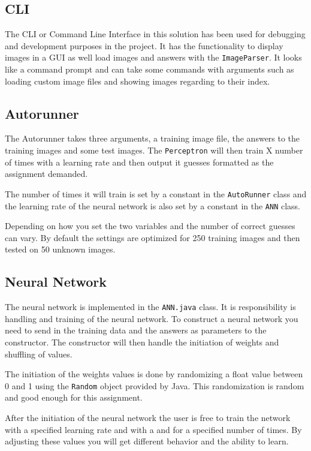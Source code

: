 \documentclass[a4paper, 12pt]{article}
\begin{document}
\subsection{CLI}
The CLI or Command Line Interface in this solution has been used for debugging and development purposes in the project. It has the functionality to display images in a GUI as well load images and answers with the \verb|ImageParser|. It looks like a command prompt and can take some commands with arguments such as loading custom image files and showing images regarding to their index.

\subsection{Autorunner}
The Autorunner takes three arguments, a training image file, the answers to the training images and some test images. The \verb|Perceptron| will then train X number of times with a learning rate and then output it guesses formatted as the assignment demanded.

The number of times it will train is set by a constant in the \verb|AutoRunner| class and the learning rate of the neural network is also set by a constant in the \verb|ANN| class.

Depending on how you set the two variables and the number of correct guesses can vary. By default the settings are optimized for 250 training images and then tested on 50 unknown images.

\subsection{Neural Network}
The neural network is implemented in the \verb|ANN.java| class. It is responsibility is handling and training of the neural network. To construct a neural network you need to send in the training data and the answers as parameters to the constructor. The constructor will then handle the initiation of weights and shuffling of values.

The initiation of the weights values is done by randomizing a float value between 0 and 1 using the \verb|Random| object provided by Java. This randomization is random and good enough for this assignment.

After the initiation of the neural network the user is free to train the network with a specified learning rate and with a and for a specified number of times. By adjusting these values you will get different behavior and the ability to learn.
\end{document}
